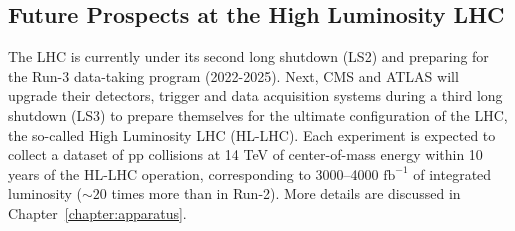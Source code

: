 \subsection{Future Prospects at the High Luminosity LHC}
The LHC is currently under its second long shutdown (LS2) and preparing for the Run-3 data-taking program (2022-2025). Next, CMS and ATLAS will upgrade their detectors, trigger and data acquisition systems during a third long shutdown (LS3) to prepare themselves for the ultimate configuration of the LHC, the so-called High Luminosity LHC (HL-LHC). Each experiment is expected to collect a dataset of pp collisions at 14 TeV of center-of-mass energy within 10 years of the HL-LHC operation, corresponding to 3000--4000 $\mathrm{fb^{-1}}$ of integrated luminosity ($\sim20$ times more than in Run-2). More details are discussed in Chapter~\ref{chapter:apparatus}.  

